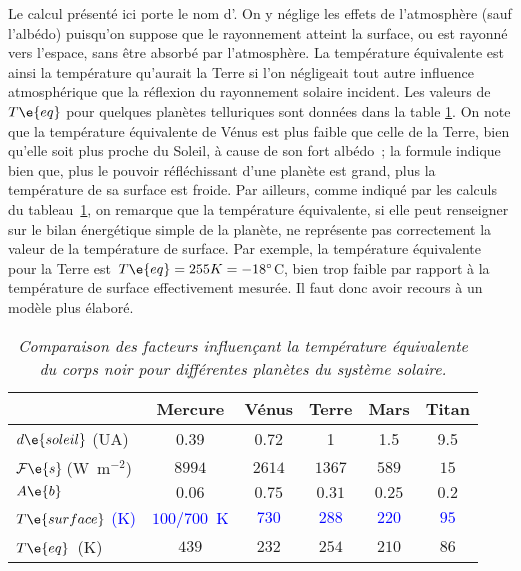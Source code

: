 Le calcul présenté ici porte le nom d'. On y néglige les effets de l'atmosphère (sauf l'albédo) puisqu'on suppose que le rayonnement atteint la surface, ou est rayonné vers l'espace, sans être absorbé par l'atmosphère. La température équivalente est ainsi la température qu'aurait la Terre si l'on négligeait tout autre influence atmosphérique que la réflexion du rayonnement solaire incident. Les valeurs de $T\e{eq}$ pour quelques planètes telluriques sont données dans la table \ref{tab:planets}. On note que la température équivalente de Vénus est plus faible que celle de la Terre, bien qu'elle soit plus proche du Soleil, à cause de son fort albédo~; la formule indique bien que, plus le pouvoir réfléchissant d'une planète est grand, plus la température de sa surface est froide. Par ailleurs, comme indiqué par les calculs du tableau~\ref{tab:planets}, on remarque que la température équivalente, si elle peut renseigner sur le bilan énergétique simple de la planète, ne représente pas correctement la valeur de la température de surface. Par exemple, la température équivalente pour la Terre est~$T\e{eq} = 255 K = -18^{\circ}$C, bien trop faible par rapport à la température de surface effectivement mesurée. Il faut donc avoir recours à un modèle plus élaboré.

\begin{table}\label{tab:planets} \begin{center} \begin{tabular}{lccccc} &{\bf Mercure} &{\bf V\'enus}&{\bf Terre}&{\bf Mars} &{\bf Titan} \\ \hline $d\e{soleil}$ (UA) & 0.39 & 0.72 & 1 & 1.5 & 9.5 \\ $\mathcal{F}\e{s}\,$(W~m$^{-2}$) & $8994$ & $2614$ & $1367$ & $589$ & $15$ \\ $A\e{b}$ & $0.06$ & $0.75$ & $0.31$ & $0.25$ & $0.2$ \\ \textcolor{blue}{$T\e{surface}$ (K)} & \textcolor{blue}{$100/700$~K} & \textcolor{blue}{$730$} & \textcolor{blue}{$288$} & \textcolor{blue}{$220$} & \textcolor{blue}{$95$} \\ \hline $T\e{eq}$~(K) & $439$ & $232$ & $254$ & $210$ & $86$\\ \end{tabular} \caption{\emph{Comparaison des facteurs influençant la température équivalente du corps noir pour différentes planètes du système solaire.}} \end{center} \end{table}
